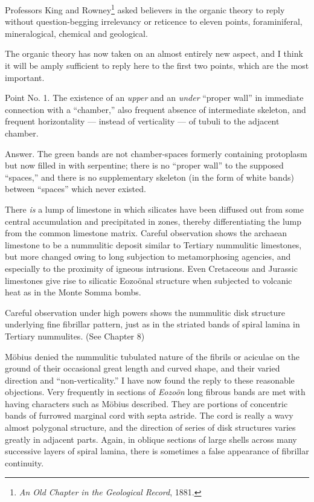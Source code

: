 \documentclass[a4paper, 12pt, oneside]{article}
\begin{document}
Professors King and Rowney\footnote{\emph{An Old Chapter in the Geological Record}, 1881.} asked believers in the organic theory to reply without question-begging irrelevancy or reticence to eleven points, foraminiferal, mineralogical, chemical and geological.

The organic theory has now taken on an almost entirely new aspect, and I think it will be amply sufficient to reply here to the first two points, which are the most important.

Point No. 1. The existence of an \emph{upper} and an \emph{under} ``proper wall'' in immediate connection with a ``chamber,'' also frequent absence of intermediate skeleton, and frequent horizontality --- instead of verticality --- of tubuli to the adjacent chamber.

Answer. The green bands are not chamber-spaces formerly containing protoplasm but now filled in with serpentine; there is no ``proper wall'' to the supposed ``spaces,'' and there is no supplementary skeleton (in the form of white bands) between ``spaces'' which never existed.

There \emph{is} a lump of limestone in which silicates have been diffused out from some central accumulation and precipitated in zones, thereby differentiating the lump from the common limestone matrix. Careful observation shows the archaean limestone to be a nummulitic deposit similar to Tertiary nummulitic limestones, but more changed owing to long subjection to metamorphosing agencies, and especially to the proximity of igneous intrusions. Even Cretaceous and Jurassic limestones give rise to silicatic Eozoönal structure when subjected to volcanic heat as in the Monte Somma bombs.

Careful observation under high powers shows the nummulitic disk structure underlying fine fibrillar pattern, just as in the striated bands of spiral lamina in Tertiary nummulites. (See Chapter 8)

Möbius denied the nummulitic tubulated nature of the fibrils or aciculae on the ground of their occasional great length and curved shape, and their varied direction and ``non-verticality.'' I have now found the reply to these reasonable objections. Very frequently in sections of \emph{Eozoön} long fibrous bands are met with having characters such as Möbius described. They are portions of concentric bands of furrowed marginal cord with septa astride. The cord is really a wavy almost polygonal structure, and the direction of series of disk structures varies greatly in adjacent parts. Again, in oblique sections of large shells across many successive layers of spiral lamina, there is sometimes a false appearance of fibrillar continuity.
\end{document}
